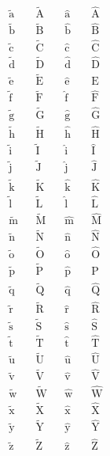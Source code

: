 \begin{align*}
  \tilde{\mathrm{a}}&&\tilde{\mathrm{A}}&&\hat{\mathrm{a}}&&\hat{\mathrm{A}}\\
  \tilde{\mathrm{b}}&&\tilde{\mathrm{B}}&&\hat{\mathrm{b}}&&\hat{\mathrm{B}}\\
  \tilde{\mathrm{c}}&&\tilde{\mathrm{C}}&&\hat{\mathrm{c}}&&\hat{\mathrm{C}}\\
  \tilde{\mathrm{d}}&&\tilde{\mathrm{D}}&&\hat{\mathrm{d}}&&\hat{\mathrm{D}}\\
  \tilde{\mathrm{e}}&&\tilde{\mathrm{E}}&&\hat{\mathrm{e}}&&\hat{\mathrm{E}}\\
  \tilde{\mathrm{f}}&&\tilde{\mathrm{F}}&&\hat{\mathrm{f}}&&\hat{\mathrm{F}}\\
  \tilde{\mathrm{g}}&&\tilde{\mathrm{G}}&&\hat{\mathrm{g}}&&\hat{\mathrm{G}}\\
  \tilde{\mathrm{h}}&&\tilde{\mathrm{H}}&&\hat{\mathrm{h}}&&\hat{\mathrm{H}}\\
  \tilde{\mathrm{i}}&&\tilde{\mathrm{I}}&&\hat{\mathrm{i}}&&\hat{\mathrm{I}}\\
  \tilde{\mathrm{j}}&&\tilde{\mathrm{J}}&&\hat{\mathrm{j}}&&\hat{\mathrm{J}}\\
  \tilde{\mathrm{k}}&&\tilde{\mathrm{K}}&&\hat{\mathrm{k}}&&\hat{\mathrm{K}}\\
  \tilde{\mathrm{l}}&&\tilde{\mathrm{L}}&&\hat{\mathrm{l}}&&\hat{\mathrm{L}}\\
  \tilde{\mathrm{m}}&&\tilde{\mathrm{M}}&&\hat{\mathrm{m}}&&\hat{\mathrm{M}}\\
  \tilde{\mathrm{n}}&&\tilde{\mathrm{N}}&&\hat{\mathrm{n}}&&\hat{\mathrm{N}}\\
  \tilde{\mathrm{o}}&&\tilde{\mathrm{O}}&&\hat{\mathrm{o}}&&\hat{\mathrm{O}}\\
  \tilde{\mathrm{p}}&&\tilde{\mathrm{P}}&&\hat{\mathrm{p}}&&\hat{\mathrm{P}}\\
  \tilde{\mathrm{q}}&&\tilde{\mathrm{Q}}&&\hat{\mathrm{q}}&&\hat{\mathrm{Q}}\\
  \tilde{\mathrm{r}}&&\tilde{\mathrm{R}}&&\hat{\mathrm{r}}&&\hat{\mathrm{R}}\\
  \tilde{\mathrm{s}}&&\tilde{\mathrm{S}}&&\hat{\mathrm{s}}&&\hat{\mathrm{S}}\\
  \tilde{\mathrm{t}}&&\tilde{\mathrm{T}}&&\hat{\mathrm{t}}&&\hat{\mathrm{T}}\\
  \tilde{\mathrm{u}}&&\tilde{\mathrm{U}}&&\hat{\mathrm{u}}&&\hat{\mathrm{U}}\\
  \tilde{\mathrm{v}}&&\tilde{\mathrm{V}}&&\hat{\mathrm{v}}&&\hat{\mathrm{V}}\\
  \tilde{\mathrm{w}}&&\tilde{\mathrm{W}}&&\hat{\mathrm{w}}&&\hat{\mathrm{W}}\\
  \tilde{\mathrm{x}}&&\tilde{\mathrm{X}}&&\hat{\mathrm{x}}&&\hat{\mathrm{X}}\\
  \tilde{\mathrm{y}}&&\tilde{\mathrm{Y}}&&\hat{\mathrm{y}}&&\hat{\mathrm{Y}}\\
  \tilde{\mathrm{z}}&&\tilde{\mathrm{Z}}&&\hat{\mathrm{z}}&&\hat{\mathrm{Z}}
\end{align*}

